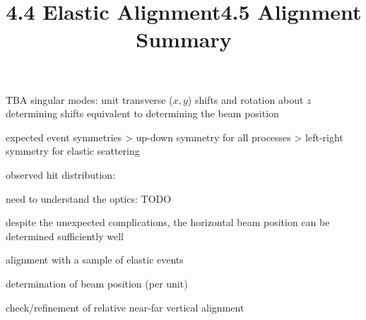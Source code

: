 \> TBA singular modes: unit transverse ($x, y$) shifts and rotation about $z$
\> determining shifts equivalent to determining the beam position

\> expected event symmetries
\>> up-down symmetry for all processes
\>> left-right symmetry for elastic scattering

\> observed hit distribution:


\> need to understand the optics: TODO

\> despite the unexpected complications, the horizontal beam position can be determined sufficiently well



\newpage%
\title{4.4 Elastic Alignment}

\> alignment with a sample of elastic events

\> determination of beam position (per unit)


\> check/refinement of relative near-far vertical alignment


%
%

\newpage%
\title{4.5 Alignment Summary}

